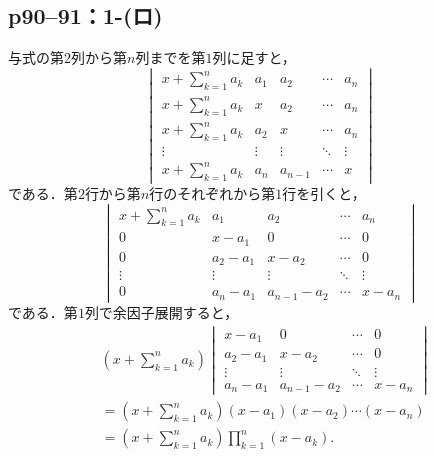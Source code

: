 \documentclass[a4paper,10pt,fleqn]{ltjsarticle}
\begin{document}
\subsection*{p90--91：1-(ロ)}

\begin{tleftbar}
    与式の第$2$列から第$n$列までを第$1$列に足すと，
    \[
        \begin{vmatrix}
            x+\sum_{k=1}^{n} a_k & a_1    & a_2     & \cdots & a_n    \\
            x+\sum_{k=1}^{n} a_k & x      & a_2     & \cdots & a_n    \\
            x+\sum_{k=1}^{n} a_k & a_2    & x       & \cdots & a_n    \\
            \vdots               & \vdots & \vdots  & \ddots & \vdots \\
            x+\sum_{k=1}^{n} a_k & a_n    & a_{n-1} & \cdots & x
        \end{vmatrix}
    \]
    である．第$2$行から第$n$行のそれぞれから第$1$行を引くと，
    \[
        \begin{vmatrix}
            x+\sum_{k=1}^{n} a_k & a_1      & a_2         & \cdots & a_n    \\
            0                    & x-a_1    & 0           & \cdots & 0      \\
            0                    & a_2 -a_1 & x-a_2       & \cdots & 0      \\
            \vdots               & \vdots   & \vdots      & \ddots & \vdots \\
            0                    & a_n-a_1  & a_{n-1}-a_2 & \cdots & x-a_n
        \end{vmatrix}
    \]
    である．第$1$列で余因子展開すると，
    \begin{align*}
         &
        (x+\sum_{k=1}^{n} a_k)
        \begin{vmatrix}
            x-a_1    & 0           & \cdots & 0      \\
            a_2 -a_1 & x-a_2       & \cdots & 0      \\
            \vdots   & \vdots      & \ddots & \vdots \\
            a_n-a_1  & a_{n-1}-a_2 & \cdots & x-a_n
        \end{vmatrix}
        \\
         & = (x+\sum_{k=1}^{n} a_k) (x-a_1)(x-a_2) \dotsm (x-a_n) \\
         & = (x+\sum_{k=1}^{n} a_k) \prod_{k=1}^{n} (x-a_k).
    \end{align*}
\end{tleftbar}
\newpage
\end{document}
